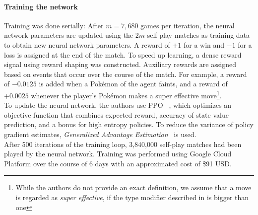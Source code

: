 \paragraph{Training the network}
Training was done serially: After $m = 7,680$ games per iteration, the neural network parameters are updated
using the $2m$ self-play matches as training data to obtain new neural network parameters. A reward
of $+1$ for a win and $-1$ for a loss is assigned at the end of the match. To speed up learning, a 
dense reward signal using reward shaping was constructed. Auxiliary rewards are assigned based on
events that occur over the course of the match. For example, a reward of $-0.0125$ is added when a 
Pokémon of the agent faints, and a reward of $+0.0025$ whenever the player's Pokémon makes a 
super effective move\footnote{While the authors do not provide an exact definition, we assume
that a move is regarded as \textit{super effective}, if the type modifier described in 
 is bigger than one}. \\
To update the neural network, the authors use \ac{PPO} ~\autocite{schulman2017proximal}, which optimizes
an objective function that combines expected reward, accuracy of state value prediction, and a bonus
for high entropy policies. To reduce the variance of policy gradient estimates, \textit{Generalized
Advantage Estimation}~\autocite{schulman2018highdimensional} is used. \\
After 500 iterations of the training loop, 3,840,000 self-play matches had been played by the neural
network. Training was performed using Google Cloud Platform over the course of 6 days with an 
approximated cost of \$91 USD.

